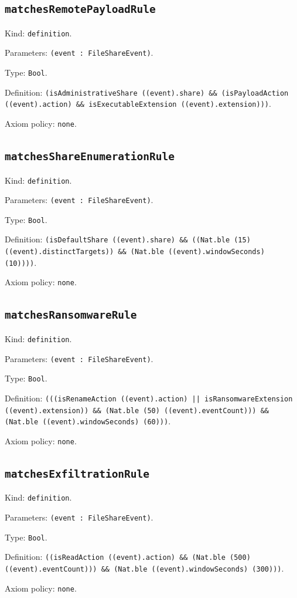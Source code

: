 \documentclass[11pt]{article}
\begin{document}
\subsection*{\texttt{matchesRemotePayloadRule}}
\noindent Kind: \texttt{definition}.\par
\noindent Parameters: \texttt{(event : FileShareEvent)}.\par
\noindent Type: \texttt{Bool}.\par
\noindent Definition: \texttt{(isAdministrativeShare ((event).share) \&\& (isPayloadAction ((event).action) \&\& isExecutableExtension ((event).extension)))}.\par
\noindent Axiom policy: \texttt{none}.\par
\subsection*{\texttt{matchesShareEnumerationRule}}
\noindent Kind: \texttt{definition}.\par
\noindent Parameters: \texttt{(event : FileShareEvent)}.\par
\noindent Type: \texttt{Bool}.\par
\noindent Definition: \texttt{(isDefaultShare ((event).share) \&\& ((Nat.ble (15) ((event).distinctTargets)) \&\& (Nat.ble ((event).windowSeconds) (10))))}.\par
\noindent Axiom policy: \texttt{none}.\par
\subsection*{\texttt{matchesRansomwareRule}}
\noindent Kind: \texttt{definition}.\par
\noindent Parameters: \texttt{(event : FileShareEvent)}.\par
\noindent Type: \texttt{Bool}.\par
\noindent Definition: \texttt{(((isRenameAction ((event).action) || isRansomwareExtension ((event).extension)) \&\& (Nat.ble (50) ((event).eventCount))) \&\& (Nat.ble ((event).windowSeconds) (60)))}.\par
\noindent Axiom policy: \texttt{none}.\par
\subsection*{\texttt{matchesExfiltrationRule}}
\noindent Kind: \texttt{definition}.\par
\noindent Parameters: \texttt{(event : FileShareEvent)}.\par
\noindent Type: \texttt{Bool}.\par
\noindent Definition: \texttt{((isReadAction ((event).action) \&\& (Nat.ble (500) ((event).eventCount))) \&\& (Nat.ble ((event).windowSeconds) (300)))}.\par
\noindent Axiom policy: \texttt{none}.\par
\end{document}
